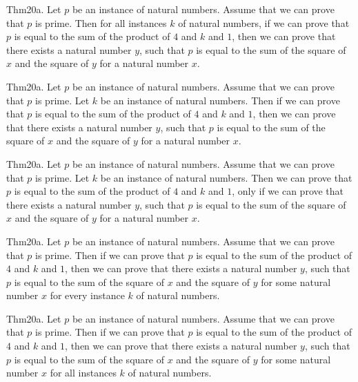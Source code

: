 \documentclass{article}
\begin{document}
Thm20a. Let $p$ be an instance of natural numbers. Assume that we can prove that $p$ is prime. Then for all instances $k$ of natural numbers, if we can prove that $p$ is equal to the sum of the product of $4$ and $k$ and $1$, then we can prove that there exists a natural number $y$, such that $p$ is equal to the sum of the square of $x$ and the square of $y$ for a natural number $x$.

Thm20a. Let $p$ be an instance of natural numbers. Assume that we can prove that $p$ is prime. Let $k$ be an instance of natural numbers. Then if we can prove that $p$ is equal to the sum of the product of $4$ and $k$ and $1$, then we can prove that there exists a natural number $y$, such that $p$ is equal to the sum of the square of $x$ and the square of $y$ for a natural number $x$.

Thm20a. Let $p$ be an instance of natural numbers. Assume that we can prove that $p$ is prime. Let $k$ be an instance of natural numbers. Then we can prove that $p$ is equal to the sum of the product of $4$ and $k$ and $1$, only if we can prove that there exists a natural number $y$, such that $p$ is equal to the sum of the square of $x$ and the square of $y$ for a natural number $x$.

Thm20a. Let $p$ be an instance of natural numbers. Assume that we can prove that $p$ is prime. Then if we can prove that $p$ is equal to the sum of the product of $4$ and $k$ and $1$, then we can prove that there exists a natural number $y$, such that $p$ is equal to the sum of the square of $x$ and the square of $y$ for some natural number $x$ for every instance $k$ of natural numbers.

Thm20a. Let $p$ be an instance of natural numbers. Assume that we can prove that $p$ is prime. Then if we can prove that $p$ is equal to the sum of the product of $4$ and $k$ and $1$, then we can prove that there exists a natural number $y$, such that $p$ is equal to the sum of the square of $x$ and the square of $y$ for some natural number $x$ for all instances $k$ of natural numbers.
\end{document}
